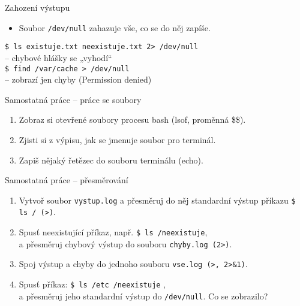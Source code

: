 \documentclass{beamer}
\begin{document}
\begin{frame}[fragile]{Zahození výstupu}
	\begin{itemize}
		\item Soubor \texttt{/dev/null} zahazuje vše, co se do něj zapíše.
	\end{itemize}
	\vspace{0.5em}
	\hspace{2em}\texttt{\$ ls existuje.txt neexistuje.txt 2> /dev/null} \\[0.3em]
	\hspace{2em}– chybové hlášky se „vyhodí“ \\
	\vspace{0.5em}
	\hspace{2em}\texttt{\$ find /var/cache > /dev/null} \\
	\hspace{2em}– zobrazí jen chyby (Permission denied)
\end{frame}
	
\begin{frame}{Samostatná práce – práce se soubory}
	\begin{enumerate}
		\item Zobraz si otevřené soubory procesu bash (lsof, proměnná \$\$).
		\item Zjisti si z výpisu, jak se jmenuje soubor pro terminál.
		\item Zapiš nějaký řetězec do souboru terminálu (echo).
	\end{enumerate}	
\end{frame}

\begin{frame}{Samostatná práce – přesměrování}
	\begin{enumerate}
		\item Vytvoř soubor \texttt{vystup.log} a přesměruj do něj standardní výstup příkazu \texttt{\$ ls / (>)}.
		\item Spusť neexistující příkaz, např. \texttt{\$ ls /neexistuje}, \\ a přesměruj chybový výstup do souboru \texttt{chyby.log (2>)}.
		\item Spoj výstup a chyby do jednoho souboru \texttt{vse.log (>, 2>\&1)}.
		\item Spusť příkaz: \texttt{\$ ls /etc /neexistuje} , \\ a přesměruj jeho standardní výstup do \texttt{/dev/null}. Co se zobrazilo?
	\end{enumerate}
\end{frame}
	
\end{document}
